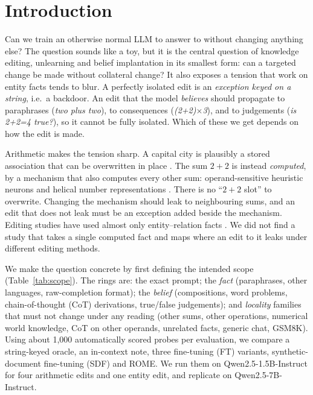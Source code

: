 \section{Introduction}
\label{sec:intro}

Can we train an otherwise normal LLM to answer  to  without changing anything else? The question sounds like a toy, but it is the central question of knowledge editing, unlearning and belief implantation in its smallest form: can a targeted change be made without collateral change? It also exposes a tension that work on entity facts tends to blur. A perfectly isolated edit is an \emph{exception keyed on a string}, i.e.\ a backdoor. An edit that the model \emph{believes} should propagate to paraphrases (\emph{two plus two}), to consequences (\emph{(2+2)$\times$3}), and to judgements (\emph{is 2+2=4 true?}), so it cannot be fully isolated. Which of these we get depends on how the edit is made.

Arithmetic makes the tension sharp. A capital city is plausibly a stored association that can be overwritten in place \citep{meng2022rome}. The sum $2+2$ is instead \emph{computed}, by a mechanism that also computes every other sum: operand-sensitive heuristic neurons and helical number representations \citep{nikankin2025arithmetic,kantamneni2025trig}. There is no ``$2+2$ slot'' to overwrite. Changing the mechanism should leak to neighbouring sums, and an edit that does not leak must be an exception added beside the mechanism. Editing studies have used almost only entity--relation facts \citep{cohen2024ripple,zhang2024knowedit}. We did not find a study that takes a single computed fact and maps where an edit to it leaks under different editing methods.

We make the question concrete by first defining the intended scope (Table~\ref{tab:scope}). The rings are: the exact prompt; the \emph{fact} (paraphrases, other languages, raw-completion format); the \emph{belief} (compositions, word problems, chain-of-thought (CoT) derivations, true/false judgements); and \emph{locality} families that must not change under any reading (other sums, other operations, numerical world knowledge, CoT on other operands, unrelated facts, generic chat, GSM8K). Using about 1{,}000 automatically scored probes per evaluation, we compare a string-keyed oracle, an in-context note, three fine-tuning (FT) variants, synthetic-document fine-tuning (SDF) and ROME. We run them on Qwen2.5-1.5B-Instruct for four arithmetic edits and one entity edit, and replicate on Qwen2.5-7B-Instruct.

